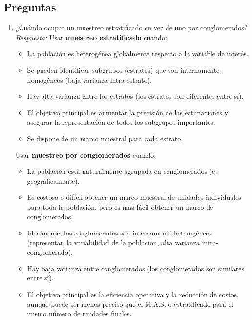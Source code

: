 \documentclass[12pt, letterpaper]{article}
\begin{document}
\subsection{Preguntas}
\begin{enumerate}
    \item ¿Cuándo ocupar un muestreo estratificado en vez de uno por conglomerados?
    \textit{Respuesta:}
    Usar \textbf{muestreo estratificado} cuando:
    \begin{itemize}
        \item La población es heterogénea globalmente respecto a la variable de interés.
        \item Se pueden identificar subgrupos (estratos) que son internamente homogéneos (baja varianza intra-estrato).
        \item Hay alta varianza entre los estratos (los estratos son diferentes entre sí).
        \item El objetivo principal es aumentar la precisión de las estimaciones y asegurar la representación de todos los subgrupos importantes.
        \item Se dispone de un marco muestral para cada estrato.
    \end{itemize}
    Usar \textbf{muestreo por conglomerados} cuando:
    \begin{itemize}
        \item La población está naturalmente agrupada en conglomerados (ej. geográficamente).
        \item Es costoso o difícil obtener un marco muestral de unidades individuales para toda la población, pero es más fácil obtener un marco de conglomerados.
        \item Idealmente, los conglomerados son internamente heterogéneos (representan la variabilidad de la población, alta varianza intra-conglomerado).
        \item Hay baja varianza entre conglomerados (los conglomerados son similares entre sí).
        \item El objetivo principal es la eficiencia operativa y la reducción de costos, aunque puede ser menos preciso que el M.A.S. o estratificado para el mismo número de unidades finales.
    \end{itemize}


\end{enumerate}
\end{document}
